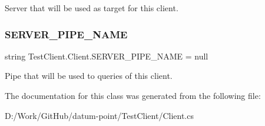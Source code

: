 Server that will be used as target for this client. 

\mbox{\label{class_test_client_1_1_client_a58c70d565592caa15b99d9b145a133ea}} 
\subsubsection{\texorpdfstring{S\+E\+R\+V\+E\+R\+\_\+\+P\+I\+P\+E\+\_\+\+N\+A\+ME}{SERVER\_PIPE\_NAME}}
{\footnotesize\ttfamily string Test\+Client.\+Client.\+S\+E\+R\+V\+E\+R\+\_\+\+P\+I\+P\+E\+\_\+\+N\+A\+ME = null\hspace{0.3cm}{\ttfamily [static]}}



Pipe that will be used to queries of this client. 



The documentation for this class was generated from the following file\+:\begin{DoxyCompactItemize}
\item 
D\+:/\+Work/\+Git\+Hub/datum-\/point/\+Test\+Client/Client.\+cs\end{DoxyCompactItemize}
